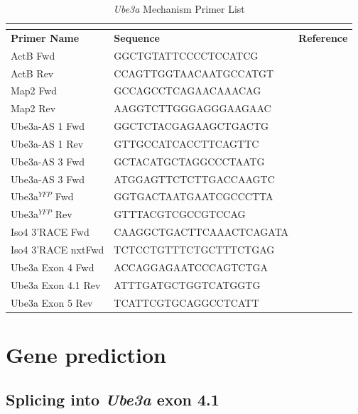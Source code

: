 \begin{longtabu} to \textwidth {X[1.5,l]X[2.5,l]X[1,c]}
  \caption{\emph{Ube3a} Mechanism Primer List}\\
  \label{primerList}\\
  \toprule
  \textbf{Primer Name} & \textbf{Sequence}       & \textbf{Reference}\\
  \midrule
  \endhead
  ActB Fwd            & GGCTGTATTCCCCTCCATCG     & \cite{Meng2012}\\
  ActB Rev            & CCAGTTGGTAACAATGCCATGT   & \cite{Meng2012}\\
  Map2 Fwd            & GCCAGCCTCAGAACAAACAG     & \\
  Map2 Rev            & AAGGTCTTGGGAGGGAAGAAC    & \\
  Ube3a-AS 1 Fwd      & GGCTCTACGAGAAGCTGACTG    & \\
  Ube3a-AS 1 Rev      & GTTGCCATCACCTTCAGTTC     & \\
  Ube3a-AS 3 Fwd      & GCTACATGCTAGGCCCTAATG    & \\
  Ube3a-AS 3 Fwd      & ATGGAGTTCTCTTGACCAAGTC   & \\
  Ube3a$^{YFP}$ Fwd   & GGTGACTAATGAATCGCCCTTA   & \\
  Ube3a$^{YFP}$ Rev   & GTTTACGTCGCCGTCCAG        & \\
  \midrule
  Iso4 3'RACE Fwd     & CAAGGCTGACTTCAAACTCAGATA & \\
  Iso4 3'RACE nxt\footnotemark Fwd & TCTCCTGTTTCTGCTTTCTGAG   & \\
  Ube3a Exon 4 Fwd    & ACCAGGAGAATCCCAGTCTGA    & \\
  Ube3a Exon 4.1 Rev  & ATTTGATGCTGGTCATGGTG     & \\
  Ube3a Exon 5 Rev    & TCATTCGTGCAGGCCTCATT     & \\
  \bottomrule
\end{longtabu}

\section{Gene prediction}
\subsection{Splicing into \textit{Ube3a} exon 4.1}

